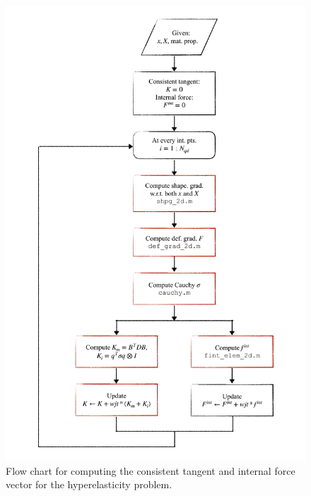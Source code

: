 \begin{figure}[!ht]
    \centering
    \includegraphics[width=0.85\linewidth]{final/part1/flow_chart_int.pdf}
    \caption{Flow chart for computing the consistent tangent and internal force vector for the hyperelasticity problem.}    
    \label{fig:final1_flow_chart_int}
\end{figure}
